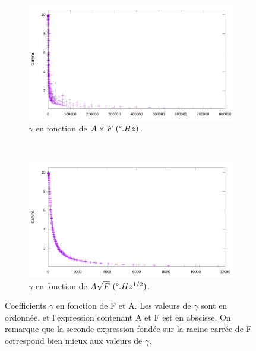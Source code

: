 	\begin{figure}[!htb]
		\centering
		\begin{subfigure}[t]{0.485\textwidth}
			\centering
			\includegraphics[width=\textwidth]{figures/ch4/afVgamma}
			\caption{$\gamma$ en fonction de $A\times{}F~(\degree{}.Hz)$.}
			\label{fig:gammaAF}
		\end{subfigure}
		~
		\begin{subfigure}[t]{0.485\textwidth}
			\centering
			\includegraphics[width=\textwidth]{figures/ch4/asqrtFVgamma}
			\caption{$\gamma$ en fonction de $A\sqrt{F}~ (\degree{}.Hz^{1/2})$.}
			\label{fig:gammaASQRTF}
		\end{subfigure}
		\caption[Coefficients $\gamma$ en fonction de F et A, bis]{Coefficients $\gamma$ en fonction de F et A. Les valeurs de $\gamma$ sont en ordonnée, et l'expression contenant A et F est en abscisse. On remarque que la seconde expression fondée sur la racine carrée de F correspond bien mieux aux valeurs de $\gamma$.}
		\label{fig:gammaVentropy}
	\end{figure}

